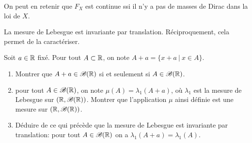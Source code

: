 {\begin{nntd-sol}[]
\begin{enumerate}
            On peut en retenir que \(F_X\) est continue ssi 
            il n'y a pas de masses de Dirac dans la loi de \(X\).
        \end{enumerate}
    \end{nntd-sol}
}{}

\begin{nnremark}
    La mesure de Lebesgue est invariante par translation. Réciproquement, cela permet de la caractériser.
\end{nnremark}

\begin{td-exo}
    Soit \(a\in\mathbb{R}\) fixé. Pour tout \(A\subset\mathbb{R}\), on note \(A+a=\{x+a\ |\ x\in A\}\).
    \begin{enumerate}
        \item Montrer que \(A+a\in\mathscr{B}(\mathbb{R})\) si et seulement si \(A\in\mathscr{B}(\mathbb{R})\).
        \item pour tout \(A\in\mathscr{B}(\mathbb{R})\), on note \(\mu(A)=\lambda_1(A+a)\), où \(\lambda_1\) est la mesure de Lebesgue sur \((\mathbb{R},\mathscr{B}(\mathbb{R}))\). Montrer que l'application \(\mu\) ainsi définie est une mesure sur \((\mathbb{R},\mathscr{B}(\mathbb{R}))\).
        \item Déduire de ce qui précède que la mesure de Lebesgue est invariante par translation: pour tout \(A\in\mathscr{B}(\mathbb{R})\) on a \(\lambda_1(A+a)=\lambda_1(A)\).
    \end{enumerate}
\end{td-exo}
